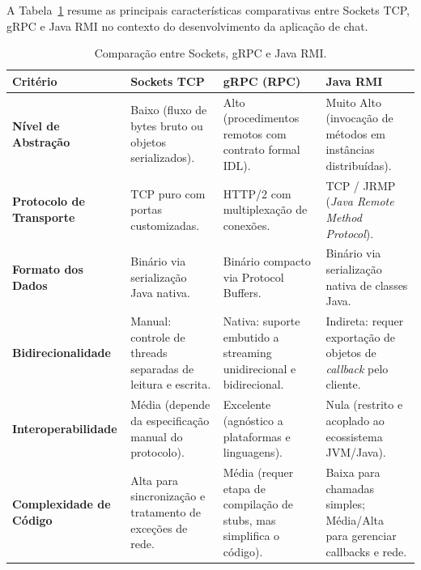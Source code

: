 \documentclass[12pt,a4paper]{article}
\begin{document}
A Tabela~\ref{tab:comparacao} resume as principais características comparativas entre Sockets TCP, gRPC e Java RMI no contexto do desenvolvimento da aplicação de chat.

\begin{table}[htbp]
\centering
\small
\caption{Comparação entre Sockets, gRPC e Java RMI.}
\label{tab:comparacao}
\begin{tabularx}{\textwidth}{lXXX}
\toprule
\textbf{Critério} & \textbf{Sockets TCP} & \textbf{gRPC (RPC)} & \textbf{Java RMI} \\
\midrule
\textbf{Nível de Abstração} & Baixo (fluxo de bytes bruto ou objetos serializados). & Alto (procedimentos remotos com contrato formal IDL). & Muito Alto (invocação de métodos em instâncias distribuídas). \\
\midrule
\textbf{Protocolo de Transporte} & TCP puro com portas customizadas. & HTTP/2 com multiplexação de conexões. & TCP / JRMP (\textit{Java Remote Method Protocol}). \\
\midrule
\textbf{Formato dos Dados} & Binário via serialização Java nativa. & Binário compacto via Protocol Buffers. & Binário via serialização nativa de classes Java. \\
\midrule
\textbf{Bidirecionalidade} & Manual: controle de threads separadas de leitura e escrita. & Nativa: suporte embutido a streaming unidirecional e bidirecional. & Indireta: requer exportação de objetos de \textit{callback} pelo cliente. \\
\midrule
\textbf{Interoperabilidade} & Média (depende da especificação manual do protocolo). & Excelente (agnóstico a plataformas e linguagens). & Nula (restrito e acoplado ao ecossistema JVM/Java). \\
\midrule
\textbf{Complexidade de Código} & Alta para sincronização e tratamento de exceções de rede. & Média (requer etapa de compilação de stubs, mas simplifica o código). & Baixa para chamadas simples; Média/Alta para gerenciar callbacks e rede. \\
\bottomrule
\end{tabularx}
\end{table}
\end{document}
